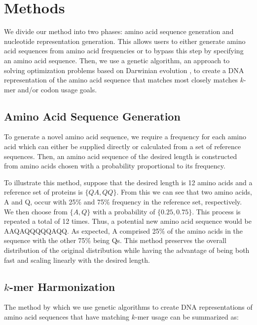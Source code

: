 \documentclass{article}
\begin{document}
\section{Methods}
We divide our method into two phases: amino acid sequence generation and nucleotide representation generation. This allows users to either generate amino acid sequences from amino acid frequencies or to bypass this step by specifying an amino acid sequence. Then, we use a genetic algorithm, an approach to solving optimization problems based on Darwinian evolution \cite{Vikhar2016}, to create a DNA representation of the amino acid sequence that matches most closely matches $k$-mer and/or codon usage goals.

\subsection{Amino Acid Sequence Generation}
To generate a novel amino acid sequence, we require a frequency for each amino acid which can either be supplied directly or calculated from a set of reference sequences. Then, an amino acid sequence of the desired length is constructed from amino acids chosen with a probability proportional to its frequency.

To illustrate this method, suppose that the desired length is 12 amino acids and a reference set of proteins is $\{QA, QQ\}$. From this we can see that two amino acids, A and Q, occur with 25\% and 75\% frequency in the reference set, respectively. We then choose from $\{A, Q\}$ with a probability of $\{0.25, 0.75\}$. This process is repeated a total of 12 times. Thus, a potential new amino acid sequence would be AAQAQQQQQAQQ. As expected, A comprised 25\% of the amino acids in the sequence with the other 75\% being Qs. This method preserves the overall distribution of the original distribution while having the advantage of being both fast and scaling linearly with the desired length.

\subsection{$k$-mer Harmonization}
The method by which we use genetic algorithms to create DNA representations of amino acid sequences that have matching $k$-mer usage can be summarized as:
\end{document}
